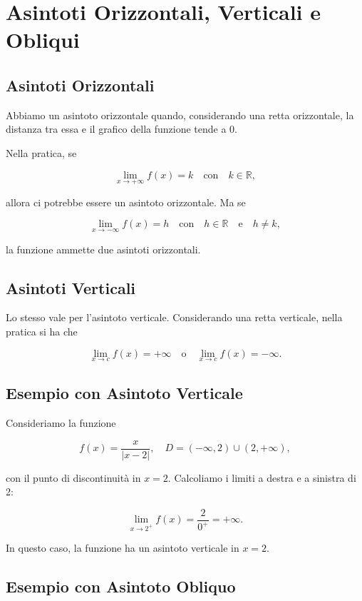 \documentclass{article}
\begin{document}
\section*{Asintoti Orizzontali, Verticali e Obliqui}

\subsection*{Asintoti Orizzontali}

Abbiamo un asintoto orizzontale quando, considerando una retta orizzontale, la distanza tra essa e il grafico della funzione tende a 0.  

Nella pratica, se 

\[
\lim_{x \to +\infty} f(x) = k \quad \text{con} \quad k \in \mathbb{R},
\]

allora ci potrebbe essere un asintoto orizzontale. Ma se

\[
\lim_{x \to -\infty} f(x) = h \quad \text{con} \quad h \in \mathbb{R} \quad \text{e} \quad h \neq k,
\]

la funzione ammette due asintoti orizzontali.

\subsection*{Asintoti Verticali}

Lo stesso vale per l'asintoto verticale. Considerando una retta verticale, nella pratica si ha che

\[
\lim_{x \to c} f(x) = +\infty \quad \text{o} \quad \lim_{x \to c} f(x) = -\infty.
\]

\subsection*{Esempio con Asintoto Verticale}

Consideriamo la funzione

\[
f(x) = \frac{x}{|x - 2|}, \quad D = (-\infty, 2) \cup (2, +\infty),
\]

con il punto di discontinuità in \( x = 2 \). Calcoliamo i limiti a destra e a sinistra di 2:

\[
\lim_{x \to 2^+} f(x) = \frac{2}{0^+} = +\infty.
\]

In questo caso, la funzione ha un asintoto verticale in \( x = 2 \).

\subsection*{Esempio con Asintoto Obliquo}
\end{document}
